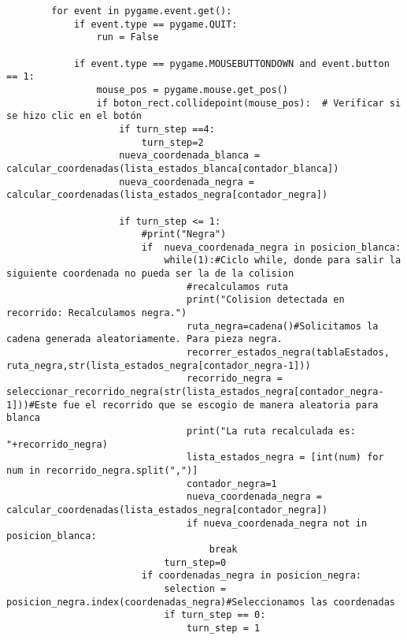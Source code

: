 \begin{lstlisting}
        for event in pygame.event.get():
            if event.type == pygame.QUIT:
                run = False

            if event.type == pygame.MOUSEBUTTONDOWN and event.button == 1:
                mouse_pos = pygame.mouse.get_pos()
                if boton_rect.collidepoint(mouse_pos):  # Verificar si se hizo clic en el botón
                    if turn_step ==4:
                        turn_step=2
                    nueva_coordenada_blanca = calcular_coordenadas(lista_estados_blanca[contador_blanca])
                    nueva_coordenada_negra = calcular_coordenadas(lista_estados_negra[contador_negra])
                    
                    if turn_step <= 1:
                        #print("Negra")
                        if  nueva_coordenada_negra in posicion_blanca:
                            while(1):#Ciclo while, donde para salir la siguiente coordenada no pueda ser la de la colision
                                #recalculamos ruta
                                print("Colision detectada en recorrido: Recalculamos negra.")
                                ruta_negra=cadena()#Solicitamos la cadena generada aleatoriamente. Para pieza negra.
                                recorrer_estados_negra(tablaEstados, ruta_negra,str(lista_estados_negra[contador_negra-1]))
                                recorrido_negra = seleccionar_recorrido_negra(str(lista_estados_negra[contador_negra-1]))#Este fue el recorrido que se escogio de manera aleatoria para blanca
                                print("La ruta recalculada es: "+recorrido_negra)
                                lista_estados_negra = [int(num) for num in recorrido_negra.split(",")]
                                contador_negra=1
                                nueva_coordenada_negra = calcular_coordenadas(lista_estados_negra[contador_negra])
                                if nueva_coordenada_negra not in posicion_blanca:
                                    break
                            turn_step=0
                        if coordenadas_negra in posicion_negra:
                            selection = posicion_negra.index(coordenadas_negra)#Seleccionamos las coordenadas
                            if turn_step == 0:
                                turn_step = 1
                        

\end{lstlisting}
